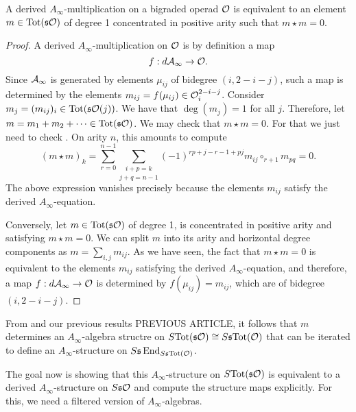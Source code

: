\documentclass[twoside]{article}
\begin{document}
\begin{lem}\label{mstar}
A derived $A_\infty$-multiplication on a bigraded operad ${\mathcal O}$ is equivalent to an element $m\in\mathrm{Tot}(\mathfrak{s}{\mathcal O})$ of degree 1 concentrated in positive arity such that $m\star m = 0$. 
\end{lem}
\begin{proof}
A derived $A_\infty$-multiplication on ${\mathcal O}$ is by definition a map 
\[f:d\mathcal{A}_\infty\to{\mathcal O}.\]
Since $\mathcal{A}_\infty$ is generated by elements $\mu_{ij}$ of bidegree $(i,2-i-j)$, such a map is determined by the elements $m_{ij}=f(\mu_{ij})\in{\mathcal O}^{2-i-j}_i$. Consider $m_j = (m_{ij})_i\in\mathrm{Tot}(\mathfrak{s}{\mathcal O}(j))$. We have that $\deg(m_j)=1$ for all $j$. Therefore, let $m=m_1+m_2+\cdots\in\mathrm{Tot}(\mathfrak{s}{\mathcal O})$. We may check that $m\star m=0$. For that we just need to check . On arity $n$, this amounts to compute 
\[(m\star m)_k = \sum_{r=0}^{n-1}\underset{j+q=n-1}{\sum_{i+p=k}}(-1)^{rp+j-r-1+ pj}m_{ij}\circ_{r+1}m_{pq}=0.\]
The above expression vanishes precisely because the elements $m_{ij}$ satisfy the derived $A_\infty$-equation.

Conversely, let $m\in\mathrm{Tot}(\mathfrak{s}{\mathcal O})$ of degree 1, is concentrated in positive arity and satisfying $m\star m=0$. We can split $m$ into its arity and horizontal degree components as $m=\sum_{i,j}m_{ij}$. As we have seen, the fact that $m\star m=0$ is equivalent to the elements $m_{ij}$ satisfying the derived $A_\infty$-equation, and therefore, a map $f:d\mathcal{A}_\infty\to{\mathcal O}$ is determined by $f(\mu_{ij})=m_{ij}$, which are of bidegree $(i,2-i-j)$. 
\end{proof}


From  and our previous results PREVIOUS ARTICLE, it follows that $m$ determines an $A_\infty$-algebra structre on $S\mathrm{Tot}(\mathfrak{s}{\mathcal O})\cong S\mathfrak{s} \mathrm{Tot}({\mathcal O})$ %
that can be iterated to define an $A_\infty$-structure on $S\mathfrak{s}\operatorname{End}_{S\mathfrak{s} \mathrm{Tot}({\mathcal O})}$.%

The goal now is showing that this $A_\infty$-structure on $S\mathrm{Tot}(\mathfrak{s}{\mathcal O})$ is equivalent to a derived $A_\infty$-structure on $S\mathfrak{s} {\mathcal O}$ and compute the structure maps explicitly. For this, we need a filtered version of $A_\infty$-algebras.
\end{document}
